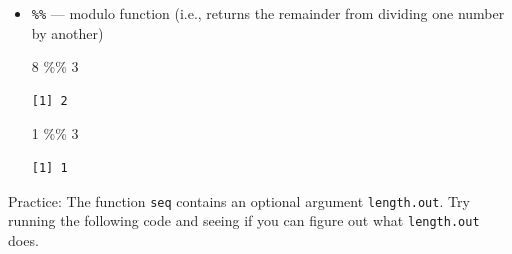 \documentclass[
  letterpaper,
  DIV=11,
  numbers=noendperiod]{scrreprt}
\newenvironment{Shaded}{\begin{snugshade}}{\end{snugshade}}
\newcommand{\DecValTok}[1]{\textcolor[rgb]{0.68,0.00,0.00}{#1}}
\newcommand{\FunctionTok}[1]{\textcolor[rgb]{0.28,0.35,0.67}{#1}}
\newcommand{\NormalTok}[1]{\textcolor[rgb]{0.00,0.23,0.31}{#1}}
\newcommand{\SpecialCharTok}[1]{\textcolor[rgb]{0.37,0.37,0.37}{#1}}
\begin{document}
\begin{itemize}
\begin{verbatim}
[1] 1 3 5
\end{verbatim}

\begin{Shaded}
\begin{Highlighting}[]
\FunctionTok{order}\NormalTok{(}\FunctionTok{c}\NormalTok{(}\DecValTok{3}\NormalTok{,}\DecValTok{1}\NormalTok{,}\DecValTok{5}\NormalTok{))}
\end{Highlighting}
\end{Shaded}

\begin{verbatim}
[1] 2 1 3
\end{verbatim}

\begin{Shaded}
\begin{Highlighting}[]
\FunctionTok{rev}\NormalTok{(}\FunctionTok{c}\NormalTok{(}\DecValTok{3}\NormalTok{,}\DecValTok{1}\NormalTok{,}\DecValTok{5}\NormalTok{))}
\end{Highlighting}
\end{Shaded}

\begin{verbatim}
[1] 5 1 3
\end{verbatim}
\item
  \texttt{\%\%} --- modulo function (i.e., returns the remainder from
  dividing one number by another)

\begin{Shaded}
\begin{Highlighting}[]
\DecValTok{8} \SpecialCharTok{\%\%} \DecValTok{3}
\end{Highlighting}
\end{Shaded}

\begin{verbatim}
[1] 2
\end{verbatim}

\begin{Shaded}
\begin{Highlighting}[]
\DecValTok{1} \SpecialCharTok{\%\%} \DecValTok{3}
\end{Highlighting}
\end{Shaded}

\begin{verbatim}
[1] 1
\end{verbatim}
\end{itemize}

{Practice:} The function \texttt{seq} contains an optional argument
\texttt{length.out}. Try running the following code and seeing if you
can figure out what \texttt{length.out} does.
\end{document}
